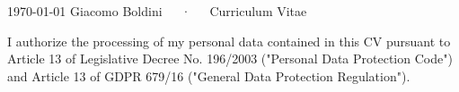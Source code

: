\documentclass[11pt, a4paper]{awesome-cv}
\begin{document}
\makecvheader[L]

\makecvfooter
  {\today}
  {Giacomo Boldini~~~·~~~Curriculum Vitae}
  {\thepage}









% 
% 
% 
% 

\vfill
\begin{descriptionstyle}{
I authorize the processing of my personal data contained in this CV 
pursuant to Article 13 of Legislative Decree No. 196/2003 ("Personal Data Protection Code")
and Article 13 of GDPR 679/16 ("General Data Protection Regulation").
}
\end{descriptionstyle}
\vspace{\baselineskip}

\end{document}
